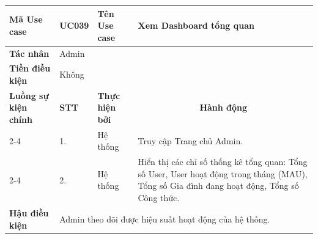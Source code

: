 \begin{longtable}{|p{2.7cm}|p{0.8cm}|p{2.6cm}|p{7.3cm}|}
\hline
\cellcolor[HTML]{D5F5E3}\textbf{Mã Use case} & \multicolumn{1}{l|}{UC039} & \cellcolor[HTML]{D5F5E3}\textbf{Tên Use case} & Xem Dashboard tổng quan \\ \hline
\cellcolor[HTML]{D5F5E3}\textbf{Tác nhân} & \multicolumn{3}{p{10.7cm}|}{Admin} \\ \hline
\cellcolor[HTML]{D5F5E3}\textbf{Tiền điều kiện} & \multicolumn{3}{p{10.7cm}|}{Không} \\ \hline

\cellcolor[HTML]{D5F5E3}\textbf{Luồng sự kiện chính} & \cellcolor[HTML]{FDEBD0}\textbf{STT} & \cellcolor[HTML]{FDEBD0}\textbf{Thực hiện bởi} & \multicolumn{1}{c|}{\cellcolor[HTML]{FDEBD0}\textbf{Hành động}} \\ \cline{2-4} 
\cellcolor[HTML]{D5F5E3} & 1. & Hệ thống & Truy cập Trang chủ Admin. \\ \cline{2-4} 
\cellcolor[HTML]{D5F5E3} & 2. & Hệ thống & Hiển thị các chỉ số thống kê tổng quan: Tổng số User, User hoạt động trong tháng (MAU), Tổng số Gia đình đang hoạt động, Tổng số Công thức. \\ \hline

\cellcolor[HTML]{D5F5E3}\textbf{Hậu điều kiện} & \multicolumn{3}{p{10.7cm}|}{Admin theo dõi được hiệu suất hoạt động của hệ thống.} \\ \hline
\end{longtable}
\endgroup

